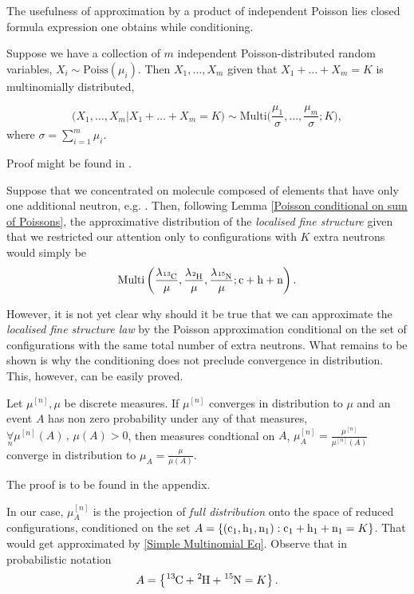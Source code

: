 The usefulness of approximation by a product of independent Poisson lies closed formula expression one obtains while conditioning. 
\begin{lemma}\label{Poisson conditional on sum of Poissons}
	Suppose we have a collection of $m$ independent Poisson-distributed random variables, $X_i \sim \mathrm{Poiss}(\mu_i)$. Then $X_1, \dots, X_m$ given that $X_1 + \dots + X_m = K$ is multinomially distributed,

$$ 
	\Big(X_1, \dots, X_m | X_1 + \dots + X_m = K \Big) 
	\sim 
	\mathrm{Multi}\Big( \frac{\mu_1}{\sigma}, \dots, \frac{\mu_m}{\sigma}; K \Big), 
$$
	where $\sigma = \sum_{i = 1}^m \mu_i$.	
\end{lemma}
Proof might be found in \cite{Kingman1993PoissonProcesses}. 


Suppose that we concentrated on molecule composed of elements that have only one additional neutron, e.g. \smallMolecule. Then, following Lemma \ref{Poisson conditional on sum of Poissons}, the approximative distribution of the {\it localised fine structure} given that we restricted our attention only to configurations with $K$ extra neutrons would simply be 
\begin{equation}\label{Simple Multinomial Eq}
	\mathrm{Multi}\left(\frac{\lambda_\cem{^{13}C}}{\mu}, \frac{\lambda_\cem{^{2}H}}{\mu}, \frac{\lambda_\cem{^{15}N}}{\mu}; \cem{c} + \cem{h} + \cem{n} \right).	
\end{equation}


However, it is not yet clear why should it be true that we can approximate the {\it localised fine structure law} by the Poisson approximation conditional on the set of configurations with the same total number of extra neutrons. What remains to be shown is why the conditioning does not preclude convergence in distribution. This, however, can be easily proved.


\begin{lemma}\label{conditional convergence lemma}
	Let $\mu^{[n]}, \mu$ be discrete measures. If $\mu^{[n]}$ converges in distribution to $\mu$ and an event $A$ has non zero probability under any of that measures, $\underset{n}{\forall} \mu^{[n]}(A)\,,\, \mu(A) > 0$, then measures condtional on $A$, $\mu^{[n]}_A = \frac{\mu^{[n]}}{\mu^{[n]}(A)}$ converge in distribution to $\mu_A = \frac{ \mu }{ \mu(A) }$.
\end{lemma}  
The proof is to be found in the appendix. 


In our case, $\mu^{[n]}_A$ is the projection of {\it full distribution} onto the space of reduced configurations, conditioned on the set $A = \left\{ ( \cem{c}_1, \cem{h}_1, \cem{n}_1 ) :  \cem{c}_1 + \cem{h}_1 + \cem{n}_1 = K\right\}$. That would get approximated by \eqref{Simple Multinomial Eq}. Observe that in probabilistic notation
$$ A =  \left\{ \cem{^{13}C} + \cem{^2H} + \cem{^{15}N} = K \right\}.$$  


